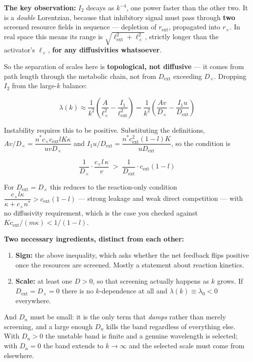 \documentclass[11pt]{article}
\begin{document}
\textbf{The key observation:} $I_2$ decays as $k^{-4}$, one power faster than the other two. It is a \emph{double} Lorentzian, because that inhibitory signal must pass through \textbf{two} screened resource fields in sequence --- depletion of $r_{\text{ext}}$, propagated into $r_\times$. In real space this means its range is $\sqrt{\ell_{\text{ext}}^2 + \ell_\times^2}$, strictly longer than the activator's $\ell_\times$, \textbf{for any diffusivities whatsoever}.

So the separation of scales here is \textbf{topological, not diffusive} --- it comes from path length through the metabolic chain, not from $D_{\text{ext}}$ exceeding $D_\times$. Dropping $I_2$ from the large-$k$ balance:

\[
\lambda(k) \approx \frac{1}{k^2}\left(\frac{A}{\ell_\times^2} - \frac{I_1}{\ell_{\text{ext}}^2}\right) = \frac{1}{k^2}\left(\frac{Av}{D_\times} - \frac{I_1 u}{D_{\text{ext}}}\right)
\]

Instability requires this to be positive. Substituting the definitions, $Av/D_\times = \dfrac{n^*c_\times c_{\text{ext}}lK\kappa}{uvD_\times}$ and $I_1u/D_{\text{ext}} = \dfrac{n^*c_{\text{ext}}^2(1-l)K}{uD_{\text{ext}}}$, so the condition is

\[
\boxed{\;\frac{1}{D_\times}\cdot\frac{c_\times l\,\kappa}{v} \;>\; \frac{1}{D_{\text{ext}}}\cdot c_{\text{ext}}(1-l)\;}
\]

For $D_{\text{ext}} = D_\times$ this reduces to the reaction-only condition $\dfrac{c_\times l\kappa}{\kappa+c_\times n^*} > c_{\text{ext}}(1-l)$ --- strong leakage and weak direct competition --- with no diffusivity requirement, which is the case you checked against $Kc_{\text{ext}}/(m\kappa) < 1/(1-l)$.

\textbf{Two necessary ingredients, distinct from each other:}

\begin{enumerate}
  \item \textbf{Sign:} the above inequality, which asks whether the net feedback flips positive once the resources are screened. Mostly a statement about reaction kinetics.
  \item \textbf{Scale:} at least one $D>0$, so that screening actually happens as $k$ grows. If $D_{\text{ext}}=D_\times=0$ there is no $k$-dependence at all and $\lambda(k)\equiv\lambda_0<0$ everywhere.
\end{enumerate}

And $D_n$ must be small: it is the only term that \emph{damps} rather than merely screening, and a large enough $D_n$ kills the band regardless of everything else. With $D_n>0$ the unstable band is finite and a genuine wavelength is selected; with $D_n = 0$ the band extends to $k\to\infty$ and the selected scale must come from elsewhere.
\end{document}
